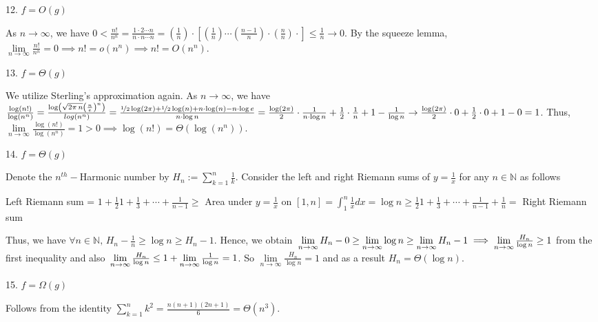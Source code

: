 \documentclass[tikz, letterpaper,12pt]{article}
\makeatletter
\newcommand{\NN}{\mathbb{N}}
\newenvironment{proof*}[1][\proofname]{\par
  \pushQED{\qed}%
  \normalfont \partopsep=\z@skip \topsep=\z@skip
  \trivlist
  \item[\hskip\labelsep
        \itshape
    #1\@addpunct{.}]\ignorespaces
}{%
  \popQED\endtrivlist\@endpefalse
}
\makeatother
\begin{document}
12. $f=O(g)$
\begin{proof*} As $n\to\infty$, we have $0<\frac{n!}{n^n}=\frac{1\cdot2\cdots n}{n\cdot n\cdots n}=\left(\frac{1}{n}\right)\cdot\left[\left(\frac{1}{n}\right)\cdots\left(\frac{n-1}{n}\right)\cdot\left(\frac{n}{n}\right)\cdot\right]\leq\frac{1}{n}\to 0$. By the squeeze lemma, $\lim\limits_{n\to\infty}\frac{n!}{n^n}=0\implies n!=o(n^n)\implies n!=O(n^n)$.
\end{proof*}

13. $f=\Theta(g)$
\begin{proof*} We utilize Sterling's approximation again.  As $n\to\infty$, we have $\frac{\log(n!)}{\log(n^n)}=\frac{\log\left(\sqrt{2\pi\,n}\left(\frac{n}{e}\right)^n\right)}{log(n^n)}\\=\frac{\nicefrac{1}{2}\log(2\pi)+\nicefrac{1}{2}\log(n)+n\cdot \log(n)-n\cdot\log e}{n\cdot \log n}=\frac{\log(2\pi)}{2}\cdot\frac{1}{n\cdot\log n}+\frac{1}{2}\cdot\frac{1}{n}+1-\frac{1}{\log n}\to \frac{\log(2\pi)}{2}\cdot0+\frac{1}{2}\cdot 0+1-0=1$. Thus, $\lim\limits_{n\to\infty}\frac{\log (n!)}{\log (n^n)}=1>0\implies \log (n!)=\Theta\left(\log (n^n)\right)$.
\end{proof*}

14. $f=\Theta(g)$

\begin{proof*}
Denote the $n^{th}-$Harmonic number by $H_n:=\sum_{k=1}^{n}\frac{1}{k}$. Consider the left and right Riemann sums of $y=\frac{1}{x}$ for any $n\in \NN$ as follows

Left Riemann sum = $1+\frac{1}{2}1+\frac{1}{3}+\cdots+\frac{1}{n-1} \geq$ Area under $y=\frac{1}{x}$ on $[1,n] =  \int_{1}^{n}\frac{1}{x} dx = \log  n \geq \frac{1}{2}1+\frac{1}{3}+\cdots+\frac{1}{n-1}+\frac{1}{n} =$ Right Riemann sum

Thus, we have $\forall n\in\NN,\,H_n-\frac{1}{n}\geq\log n\geq H_n-1$. Hence, we obtain $\\\lim\limits_{n\to\infty} H_n-0\geq\lim\limits_{n\to\infty} \log n\geq\lim\limits_{n\to\infty} H_n-1\implies \lim\limits_{n\to\infty} \frac{H_n}{\log n}\geq 1$ from the first inequality and also $\\\lim\limits_{n\to\infty} \frac{H_n}{\log n}\leq 1+\lim\limits_{n\to\infty} \frac{1}{\log n}=1$. So $\lim\limits_{n\to\infty} \frac{H_n}{\log n}=1$ and as a result $H_n=\Theta(\log n).$
\end{proof*}

15. $f=\Omega(g)$

Follows from the identity $\sum_{k=1}^{n}k^2=\frac{n(n+1)(2n+1)}{6}=\Theta(n^3)$.
\end{document}
